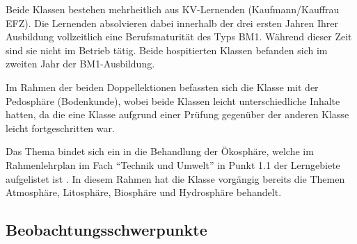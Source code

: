 Beide Klassen bestehen mehrheitlich aus KV-Lernenden (Kaufmann/Kauffrau EFZ). Die Lernenden absolvieren dabei innerhalb der drei ersten Jahren Ihrer Ausbildung vollzeitlich eine Berufsmaturität des Typs BM1. Während dieser Zeit sind sie nicht im Betrieb tätig. Beide hospitierten Klassen befanden sich im zweiten Jahr der BM1-Ausbildung.

Im Rahmen der beiden Doppellektionen befassten sich die Klasse mit der Pedosphäre (Bodenkunde), wobei beide Klassen leicht unterschiedliche Inhalte hatten, da die eine Klasse aufgrund einer Prüfung gegenüber der anderen Klasse leicht fortgeschritten war.

Das Thema bindet sich ein in die Behandlung der Ökosphäre, welche im Rahmenlehrplan im Fach ``Technik und Umwelt'' in Punkt 1.1 der Lerngebiete aufgelistet ist \cite[p. 115]{sbfi}. In diesem Rahmen hat die Klasse vorgängig bereits die Themen Atmosphäre, Litosphäre, Biosphäre und Hydrosphäre behandelt.

\subsection{Beobachtungsschwerpunkte}

